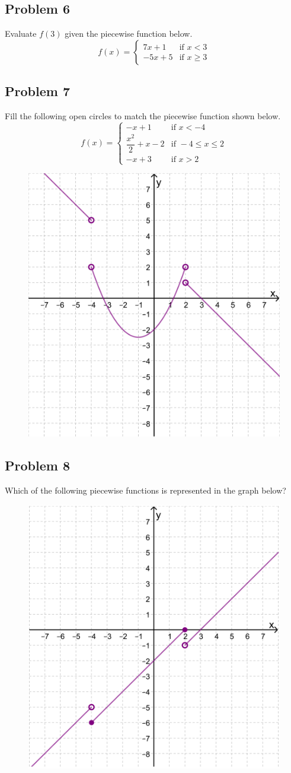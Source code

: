 \documentclass[12pt]{article}
\begin{document}
\subsection*{Problem 6}
Evaluate \(f(3)\) given the piecewise function below.
\[
f(x) = \begin{cases} 
7x + 1 & \text{if } x < 3 \\ 
-5x + 5 & \text{if } x \geq 3 
\end{cases}
\] 

\subsection*{Problem 7}
Fill the following open circles to match the piecewise function shown below.
\[
f(x) = 
\begin{cases} 
-x + 1 & \text{if } x < -4 \\ 
\dfrac{x^2}{2} + x - 2 & \text{if } -4 \leq x \leq 2 \\ 
-x + 3 & \text{if } x > 2 
\end{cases}
\]

\begin{figure}[!ht]
    \centering
    \includegraphics[width=0.4\linewidth]{1.png}
\end{figure}

\subsection*{Problem 8}
Which of the following piecewise functions is represented in the graph below?
\begin{figure}[!ht]
    \centering
    \includegraphics[width=0.5\linewidth]{2.png}
\end{figure}
\end{document}
